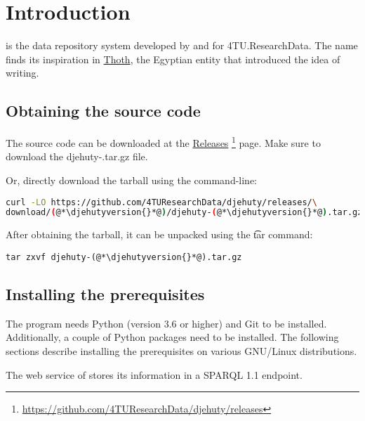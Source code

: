 \chapter{Introduction}

 is the data repository system developed by and for
4TU.ResearchData.  The name finds its inspiration in
\href{https://en.wikipedia.org/wiki/Thoth}{Thoth}, the Egyptian
entity that introduced the idea of writing.

\section{Obtaining the source code}
\label{sec:obtaining-tarball}

  \begin{sloppypar}
  The source code can be downloaded at the
  \href{https://github.com/4TUResearchData/djehuty/releases}%
  {Releases}%
  \footnote{\url{https://github.com/4TUResearchData/djehuty/releases}}
  page.  Make sure to download the {\fontfamily{\ttdefault}\selectfont
    djehuty-\djehutyversion{}.tar.gz} file.
  \end{sloppypar}

  Or, directly download the tarball using the command-line:

\begin{lstlisting}[language=bash]
curl -LO https://github.com/4TUResearchData/djehuty/releases/\
download/(@*\djehutyversion{}*@)/djehuty-(@*\djehutyversion{}*@).tar.gz
\end{lstlisting}

  After obtaining the tarball, it can be unpacked using the \t{tar}
  command:

\begin{lstlisting}
tar zxvf djehuty-(@*\djehutyversion{}*@).tar.gz
\end{lstlisting}

\section{Installing the prerequisites}
\label{sec:prerequisites}

  The  program needs Python (version 3.6 or higher) and
  Git to be installed.  Additionally, a couple of Python packages need
  to be installed.  The following sections describe installing the
  prerequisites on various GNU/Linux distributions.

  The web service of  stores its information in a SPARQL 1.1
  endpoint.  

